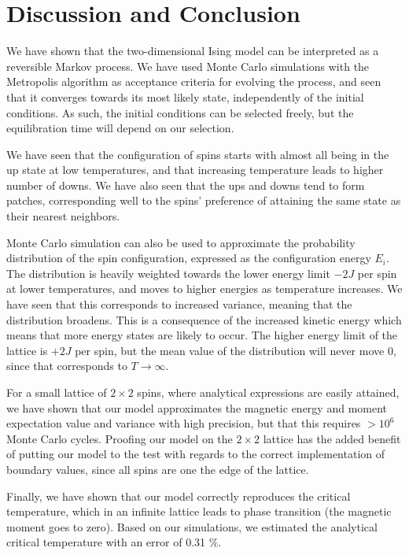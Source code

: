 \documentclass[]{article}
\begin{document}
\clearpage
\section{Discussion and Conclusion} \label{sec:conclusion}

We have shown that the two-dimensional Ising model can be interpreted as a reversible Markov process. We have used Monte Carlo simulations with the Metropolis algorithm as acceptance criteria for evolving the process, and seen that it converges towards its most likely state, independently of the initial conditions. As such, the initial conditions can be selected freely, but the equilibration time will depend on our selection.

We have seen that the configuration of spins starts with almost all being in the up state at low temperatures, and that increasing temperature leads to higher number of downs. We have also seen that the ups and downs tend to form patches, corresponding well to the spins' preference of attaining the same state as their nearest neighbors.

Monte Carlo simulation can also be used to approximate the probability distribution of the spin configuration, expressed as the configuration energy $E_i$. The distribution is heavily weighted towards the lower energy limit $-2J$ per spin at lower temperatures, and moves to higher energies as temperature increases. We have seen that this corresponds to increased variance, meaning that the distribution broadens. This is a consequence of the increased kinetic energy which means that more energy states are likely to occur. The higher energy limit of the lattice is $+2J$ per spin, but the mean value of the distribution will never move 0, since that corresponds to $T \rightarrow \infty$.

For a small lattice of $2 \times 2$ spins, where analytical expressions are easily attained, we have shown that our model approximates the magnetic energy and moment expectation value and variance with high precision, but that this requires $> 10^6$ Monte Carlo cycles. Proofing our model on the $2 \times 2$ lattice has the added benefit of putting our model to the test with regards to the correct implementation of boundary values, since all spins are one the edge of the lattice.

Finally, we have shown that our model correctly reproduces the critical temperature, which in an infinite lattice leads to phase transition (the magnetic moment goes to zero). Based on our simulations, we estimated the analytical critical temperature with an error of 0.31  \%.
\end{document}
